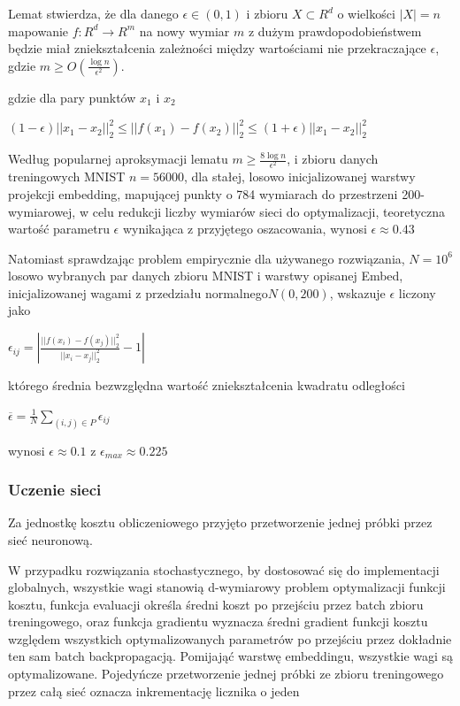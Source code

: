 Lemat stwierdza, że dla danego $\epsilon \in (0,1)$ i zbioru $X \subset R^{d}$ o wielkości $|X| = n$ mapowanie $f:R^{d} \rightarrow R^m$ na nowy wymiar $m$ z dużym prawdopodobieństwem będzie miał zniekształcenia zależności między wartościami nie przekraczające $\epsilon$, gdzie $m \geq O(\frac{\log n}{\epsilon^2})$.

gdzie dla pary punktów $x_1$ i $x_2$ 

$(1 - \epsilon)||x_1 - x_2||_2^2 \leq ||f(x_1) - f(x_2)||_2^2 \leq (1 + \epsilon)||x_1 - x_2||_2^2$

Według popularnej aproksymacji lematu $m \geq \frac{8 \log n}{\epsilon^2} $, i zbioru danych treningowych MNIST $n = 56000$, dla stałej, losowo inicjalizowanej warstwy projekcji embedding, mapującej punkty o 784 wymiarach do przestrzeni 200-wymiarowej, w celu redukcji liczby wymiarów sieci do optymalizacji, teoretyczna wartość parametru $\epsilon$ wynikająca z przyjętego oszacowania, wynosi $\epsilon \approx 0.43$

Natomiast sprawdzając problem empirycznie dla używanego rozwiązania, $N = 10^6$ losowo wybranych par danych zbioru MNIST i warstwy opisanej Embed, inicjalizowanej wagami z przedziału normalnego$N(0, 200)$, wskazuje $\epsilon$  liczony jako

$\epsilon_{ij}=|\frac{||f(x_i)-f(x_j)||_2^2}{||x_i-x_j||_2^2}-1|$

którego średnia bezwzględna wartość zniekształcenia kwadratu odległości 

$\overline{\epsilon} = \frac{1}{N} \sum_{(i,j)\in{P}} \epsilon_{ij}$

wynosi $\epsilon \approx 0.1$ z $\epsilon_{max} \approx 0.225$

\subsubsection{Uczenie sieci}

Za jednostkę kosztu obliczeniowego przyjęto przetworzenie jednej próbki przez sieć neuronową.

W przypadku rozwiązania stochastycznego, by dostosować się do implementacji globalnych, wszystkie wagi stanowią d-wymiarowy problem optymalizacji funkcji kosztu, funkcja evaluacji określa średni koszt po przejściu przez batch zbioru treningowego, oraz funkcja gradientu wyznacza średni gradient funkcji kosztu względem wszystkich optymalizowanych parametrów po przejściu przez dokładnie ten sam batch backpropagacją. Pomijająć warstwę embeddingu, wszystkie wagi są optymalizowane. Pojedyńcze przetworzenie jednej próbki ze zbioru treningowego przez całą sieć oznacza inkrementację licznika o jeden

